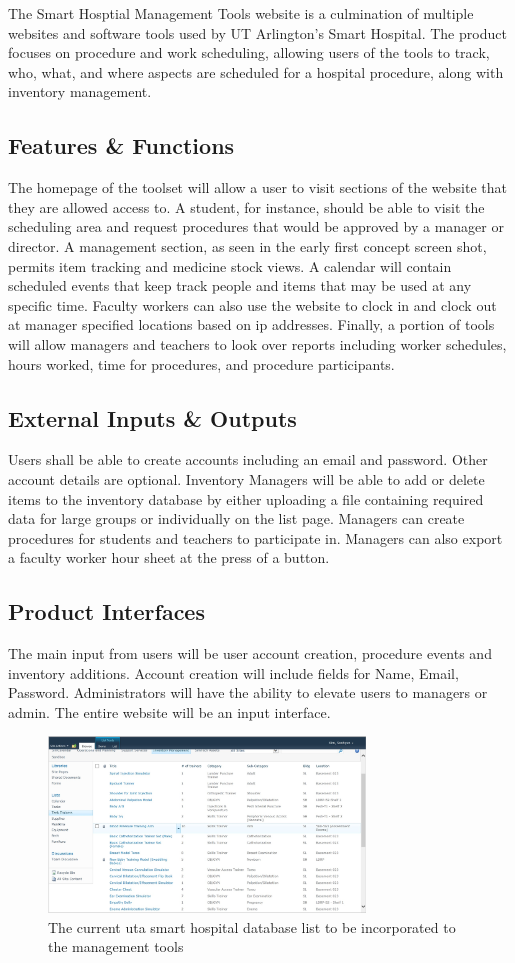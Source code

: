 The Smart Hosptial Management Tools website is a culmination of multiple websites and software tools used by UT Arlington's Smart Hospital. The product focuses on procedure and work scheduling, allowing users of the tools to track, who, what, and where aspects are scheduled for a hospital procedure, along with inventory management.

\subsection{Features \& Functions}
The homepage of the toolset will allow a user to visit sections of the website that they are allowed access to. A student, for instance, should be able to visit the scheduling area and request procedures that would be approved by a manager or director. A management section, as seen in the early first concept screen shot, permits item tracking and medicine stock views. A calendar will contain scheduled events that keep track people and items that may be used at any specific time. Faculty workers can also use the website to clock in and clock out at manager specified locations based on ip addresses. Finally, a portion of tools will allow managers and teachers to look over reports including worker schedules, hours worked, time for procedures, and procedure participants.

\subsection{External Inputs \& Outputs}
Users shall be able to create accounts including an email and password. Other account details are optional.  Inventory Managers will be able to add or delete items to the inventory database by either uploading a file containing required data for large groups or individually on the list page. Managers can create procedures for students and teachers to participate in. Managers can also export a faculty worker hour sheet at the press of a button.

\subsection{Product Interfaces}
The main input from users will be user account creation, procedure events and inventory additions. Account creation will include fields for Name, Email, Password. Administrators will have the ability to elevate users to managers or admin. The entire website will be an input interface.

\begin{figure}[h!]
	\centering
   	\includegraphics[width=0.75\textwidth]{images/concept_database}
    \caption{The current uta smart hospital database list to be incorporated to the management tools}
\end{figure}